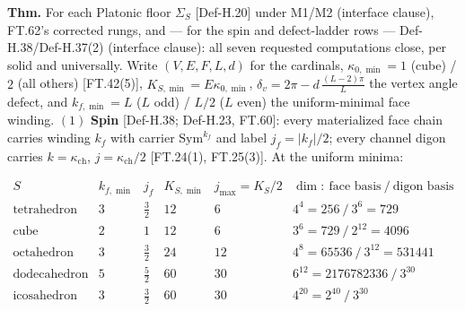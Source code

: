 \begin{theorem}\label{tag:FT-63}
\textbf{Thm.} For each Platonic floor $\Sigma_S$ [Def-H.20] under M1/M2 (interface clause), FT.62's corrected rungs, and — for the spin and defect-ladder rows — Def-H.38/Def-H.37(2) (interface clause): all seven requested computations close, per solid and universally. Write $(V,E,F,L,d)$ for the cardinals, $\kappa_{0,\min}=1$ (cube) / $2$ (all others) [FT.42(5)], $K_{S,\min}=E\kappa_{0,\min}$, $\delta_v=2\pi-d\,\frac{(L-2)\pi}{L}$ the vertex angle defect, and $k_{f,\min}=L$ ($L$ odd) / $L/2$ ($L$ even) the uniform-minimal face winding. $(1)$ \textbf{Spin} [Def-H.38; Def-H.23, FT.60]: every materialized face chain carries winding $k_f$ with carrier $\mathrm{Sym}^{k_f}$ and label $j_f=|k_f|/2$; every channel digon carries $k=\kappa_{\mathrm{ch}}$, $j=\kappa_{\mathrm{ch}}/2$ [FT.24(1), FT.25(3)]. At the uniform minima:

\[
\begin{array}{c|c|c|c|c|c}
S & k_{f,\min} & j_f & K_{S,\min} & j_{\max}=K_S/2 & \dim:\ \text{face basis}\ /\ \text{digon basis}\\ \hline
\text{tetrahedron} & 3 & \tfrac32 & 12 & 6 & 4^4=256\ /\ 3^6=729\\
\text{cube} & 2 & 1 & 12 & 6 & 3^6=729\ /\ 2^{12}=4096\\
\text{octahedron} & 3 & \tfrac32 & 24 & 12 & 4^8=65536\ /\ 3^{12}=531441\\
\text{dodecahedron} & 5 & \tfrac52 & 60 & 30 & 6^{12}=2176782336\ /\ 3^{30}\\
\text{icosahedron} & 3 & \tfrac32 & 60 & 30 & 4^{20}=2^{40}\ /\ 3^{30}
\end{array}
\]


\end{theorem}
